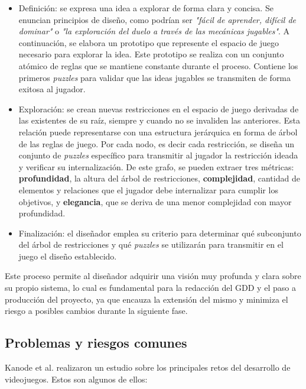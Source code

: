 \begin{itemize}
    \item Definición: se expresa una idea a explorar de forma clara y concisa. Se enuncian principios de diseño, como podrían ser \textit{"fácil de aprender, difícil de dominar"} o \textit{"la exploración del duelo a través de las mecánicas jugables"}. A continuación, se elabora un prototipo que represente el espacio de juego necesario para explorar la idea. Este prototipo se realiza con un conjunto atómico de reglas que se mantiene constante durante el proceso. Contiene los primeros \textit{puzzles} para validar que las ideas jugables se transmiten de forma exitosa al jugador.
    \item Exploración: se crean nuevas restricciones en el espacio de juego derivadas de las existentes de su raíz, siempre y cuando no se invaliden las anteriores. Esta relación puede representarse con una estructura jerárquica en forma de árbol de las reglas de juego. Por cada nodo, es decir cada restricción, se diseña un conjunto de \textit{puzzles} específico para transmitir al jugador la restricción ideada y verificar su internalización. De este grafo, se pueden extraer tres métricas: \textbf{profundidad}, la altura del árbol de restricciones, \textbf{complejidad}, cantidad de elementos y relaciones que el jugador debe internalizar para cumplir los objetivos, y \textbf{elegancia}, que se deriva de una menor complejidad con mayor profundidad.
    \item Finalización: el diseñador emplea su criterio para determinar qué subconjunto del árbol de restricciones y qué \textit{puzzles} se utilizarán para transmitir en el juego el diseño establecido.
\end{itemize}

Este proceso permite al diseñador adquirir una visión muy profunda y clara sobre su propio sistema, lo cual es fundamental para la redacción del GDD y el paso a producción del proyecto, ya que encauza la extensión del mismo y minimiza el riesgo a posibles cambios durante la siguiente fase.

\subsection{Problemas y riesgos comunes}

Kanode et al.\cite {kanode} realizaron un estudio sobre los principales retos del desarrollo de videojuegos. Estos son algunos de ellos:

